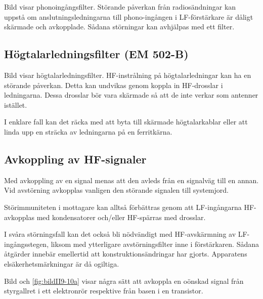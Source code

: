 Bild  visar phonoingångsfilter.
Störande påverkan från radiosändningar kan uppstå om anslutningsledningarna
till phono-ingången i LF-förstärkare är dåligt skärmade och avkopplade.
Sådana störningar kan avhjälpas med ett filter.

\newpage
\subsection{Högtalarledningsfilter (EM 502-B)}

Bild  visar högtalarledningsfilter.
HF-instrålning på högtalarledningar kan ha en störande påverkan.
Detta kan undvikas genom koppla in HF-drosslar i ledningarna.
Dessa drosslar bör vara skärmade så att de inte verkar som antenner istället.

I enklare fall kan det räcka med att byta till skärmade högtalarkablar
eller att linda upp en sträcka av ledningarna på en ferritkärna.

\newpage
\subsection{Avkoppling av HF-signaler}




Med avkoppling av en signal menas att den avleds från en signalväg till en
annan.
Vid avstörning avkopplas vanligen den störande signalen till systemjord.

Störimmuniteten i mottagare kan alltså förbättras genom att LF-ingångarna
HF-avkopplas med kondensatorer och/eller HF-spärras med drosslar.

I svåra störningsfall kan det också bli nödvändigt med HF-avskärmning av
LF-ingångsstegen, liksom med ytterligare avstörningsfilter inne i förstärkaren.
Sådana åtgärder innebär emellertid att konstruktionsändringar har gjorts.
Apparatens elsäkerhetsmärkningar är då ogiltiga.

Bild  och \ref{fig:bildII9-10a} visar några sätt att
avkoppla en oönskad signal från styrgallret i ett elektronrör respektive från
basen i en transistor.

